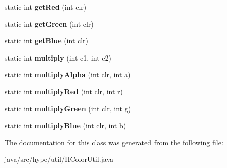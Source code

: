 \begin{DoxyCompactItemize}
\item 
\hypertarget{classhype_1_1util_1_1_h_color_util_a64a78dccd1abb4fa012cdf5d0c50b56d}{static int {\bfseries get\-Red} (int clr)}\label{classhype_1_1util_1_1_h_color_util_a64a78dccd1abb4fa012cdf5d0c50b56d}

\item 
\hypertarget{classhype_1_1util_1_1_h_color_util_af700fdfd05f52003a8d7504b32b4c9db}{static int {\bfseries get\-Green} (int clr)}\label{classhype_1_1util_1_1_h_color_util_af700fdfd05f52003a8d7504b32b4c9db}

\item 
\hypertarget{classhype_1_1util_1_1_h_color_util_a123758fac5ad0a8ec72f9964e54d0131}{static int {\bfseries get\-Blue} (int clr)}\label{classhype_1_1util_1_1_h_color_util_a123758fac5ad0a8ec72f9964e54d0131}

\item 
\hypertarget{classhype_1_1util_1_1_h_color_util_aeba45bdca8e3e4af799a7f815e76b104}{static int {\bfseries multiply} (int c1, int c2)}\label{classhype_1_1util_1_1_h_color_util_aeba45bdca8e3e4af799a7f815e76b104}

\item 
\hypertarget{classhype_1_1util_1_1_h_color_util_a0c5ce9ff0ff3fb67cf0d7169053b26bb}{static int {\bfseries multiply\-Alpha} (int clr, int a)}\label{classhype_1_1util_1_1_h_color_util_a0c5ce9ff0ff3fb67cf0d7169053b26bb}

\item 
\hypertarget{classhype_1_1util_1_1_h_color_util_a2ff3708269568ca182fdeace71f81d66}{static int {\bfseries multiply\-Red} (int clr, int r)}\label{classhype_1_1util_1_1_h_color_util_a2ff3708269568ca182fdeace71f81d66}

\item 
\hypertarget{classhype_1_1util_1_1_h_color_util_ab540175a91fb8e570f835a4178abf726}{static int {\bfseries multiply\-Green} (int clr, int g)}\label{classhype_1_1util_1_1_h_color_util_ab540175a91fb8e570f835a4178abf726}

\item 
\hypertarget{classhype_1_1util_1_1_h_color_util_aebc7cc6aa38851ccce260831942573ef}{static int {\bfseries multiply\-Blue} (int clr, int b)}\label{classhype_1_1util_1_1_h_color_util_aebc7cc6aa38851ccce260831942573ef}

\end{DoxyCompactItemize}


The documentation for this class was generated from the following file\-:\begin{DoxyCompactItemize}
\item 
java/src/hype/util/H\-Color\-Util.\-java\end{DoxyCompactItemize}
